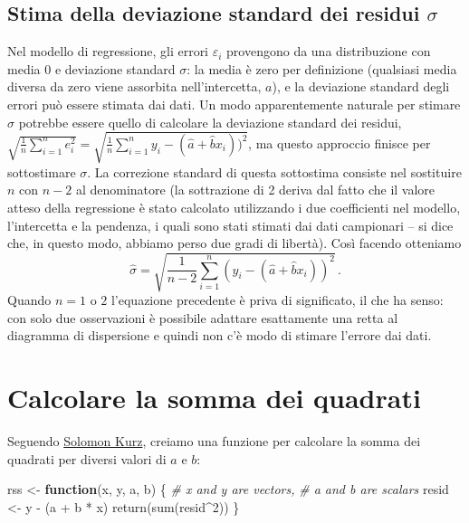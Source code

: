 \documentclass[
  10pt,
  italian,
  a4paper,
  extrafontsizes,onecolumn,openright
  ]{memoir}
\newenvironment{Shaded}{\begin{snugshade}}{\end{snugshade}}
\newcommand{\CommentTok}[1]{\textcolor[rgb]{0.56,0.35,0.01}{\textit{#1}}}
\newcommand{\ControlFlowTok}[1]{\textcolor[rgb]{0.13,0.29,0.53}{\textbf{#1}}}
\newcommand{\DecValTok}[1]{\textcolor[rgb]{0.00,0.00,0.81}{#1}}
\newcommand{\FunctionTok}[1]{\textcolor[rgb]{0.00,0.00,0.00}{#1}}
\newcommand{\NormalTok}[1]{#1}
\newcommand{\OtherTok}[1]{\textcolor[rgb]{0.56,0.35,0.01}{#1}}
\newcommand{\SpecialCharTok}[1]{\textcolor[rgb]{0.00,0.00,0.00}{#1}}
\begin{document}
\hypertarget{stima-della-deviazione-standard-dei-residui-sigma}{%
\subsection{\texorpdfstring{Stima della deviazione standard dei residui \(\sigma\)}{Stima della deviazione standard dei residui \textbackslash sigma}}\label{stima-della-deviazione-standard-dei-residui-sigma}}

Nel modello di regressione, gli errori \(\varepsilon_i\) provengono da una distribuzione con media 0 e deviazione standard \(\sigma\): la media è zero per definizione (qualsiasi media diversa da zero viene assorbita nell'intercetta, \(a\)), e la deviazione standard degli errori può essere stimata dai dati. Un modo apparentemente naturale per stimare \(\sigma\) potrebbe essere quello di calcolare la deviazione standard dei residui, \(\sqrt{\frac{1}{n} \sum_{i=1}^n e_i^2} = \sqrt{ \frac{1}{n} \sum_{i=1}^n y_i - (\hat{a} + \hat{b} x_i))^2}\), ma questo approccio finisce per sottostimare \(\sigma\).
La correzione standard di questa sottostima consiste nel sostituire \(n\) con \(n - 2\) al denominatore (la sottrazione di 2 deriva dal fatto che il valore atteso della regressione è stato calcolato utilizzando i due coefficienti nel modello, l'intercetta e la pendenza, i quali sono stati stimati dai dati campionari -- si dice che, in questo modo, abbiamo perso due gradi di libertà). Così facendo otteniamo
\begin{equation}
\hat{\sigma} = \sqrt{\frac{1}{n-2} \sum_{i=1}^n (y_i - (\hat{a} + \hat{b} x_i))^2}\,.
\end{equation}
Quando \(n = 1\) o \(2\) l'equazione precedente è priva di significato, il che ha senso: con solo due osservazioni è possibile adattare esattamente una retta al diagramma di dispersione e quindi non c'è modo di stimare l'errore dai dati.

\hypertarget{calcolare-la-somma-dei-quadrati}{%
\section{Calcolare la somma dei quadrati}\label{calcolare-la-somma-dei-quadrati}}

Seguendo \href{https://github.com/ASKurz/Working-through-Regression-and-other-stories/blob/main/08.Rmd}{Solomon Kurz}, creiamo una funzione per calcolare la somma dei quadrati per diversi valori di \(a\) e \(b\):

\begin{Shaded}
\begin{Highlighting}[]
\NormalTok{rss }\OtherTok{\textless{}{-}} \ControlFlowTok{function}\NormalTok{(x, y, a, b) \{}
  \CommentTok{\# x and y are vectors,}
  \CommentTok{\# a and b are scalars}
\NormalTok{  resid }\OtherTok{\textless{}{-}}\NormalTok{ y }\SpecialCharTok{{-}}\NormalTok{ (a }\SpecialCharTok{+}\NormalTok{ b }\SpecialCharTok{*}\NormalTok{ x)}
  \FunctionTok{return}\NormalTok{(}\FunctionTok{sum}\NormalTok{(resid}\SpecialCharTok{\^{}}\DecValTok{2}\NormalTok{))}
\NormalTok{\}}
\end{Highlighting}
\end{Shaded}
\end{document}
